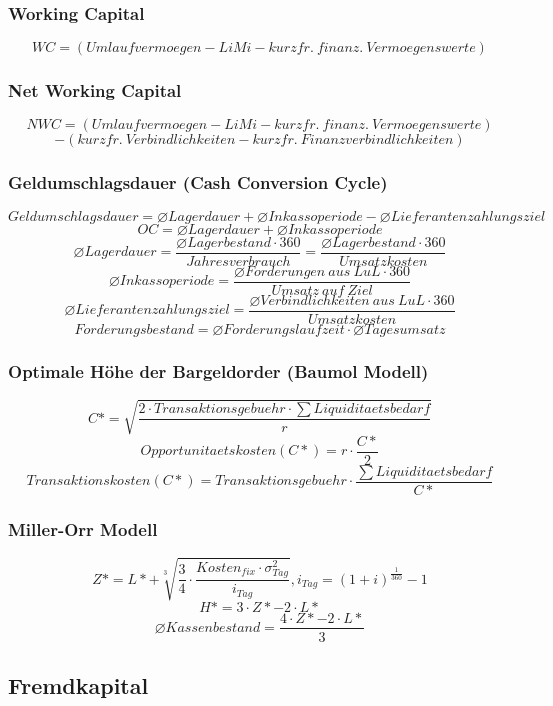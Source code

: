 \subsubsection{Working Capital}
\[WC = (Umlaufvermoegen - LiMi - kurzfr.~finanz.~Vermoegenswerte)\]

\subsubsection{Net Working Capital}
\[NWC = (Umlaufvermoegen - LiMi - kurzfr.~finanz.~Vermoegenswerte)\]
\[- (kurzfr.~Verbindlichkeiten - kurzfr.~Finanzverbindlichkeiten)\]

\subsubsection{Geldumschlagsdauer (Cash Conversion Cycle)}
\[Geldumschlagsdauer = \varnothing Lagerdauer + \varnothing Inkassoperiode - \varnothing Lieferantenzahlungsziel\]
\[OC = \varnothing Lagerdauer + \varnothing Inkassoperiode\]
\[\varnothing Lagerdauer = \frac{\varnothing Lagerbestand \cdot 360}{Jahresverbrauch} = \frac{\varnothing Lagerbestand \cdot 360}{Umsatzkosten}\]
\[\varnothing Inkassoperiode = \frac{\varnothing Forderungen~aus~LuL \cdot 360}{Umsatz~auf~Ziel}\]
\[\varnothing Lieferantenzahlungsziel = \frac{\varnothing Verbindlichkeiten~aus~LuL \cdot 360}{Umsatzkosten}\]
\[Forderungsbestand = \varnothing Forderungslaufzeit \cdot \varnothing Tagesumsatz\]

\subsubsection{Optimale Höhe der Bargeldorder (Baumol Modell)}
\[C* = \sqrt{\frac{2 \cdot Transaktionsgebuehr \cdot \sum Liquiditaetsbedarf}{r}}\]
\[Opportunitaetskosten(C*) = r \cdot \frac{C*}{2}\]
\[Transaktionskosten(C*) = Transaktionsgebuehr \cdot \frac{\sum Liquiditaetsbedarf}{C*}\]

\subsubsection{Miller-Orr Modell}
\[Z* = L* + \sqrt[3]{\frac{3}{4} \cdot \frac{Kosten_{fix} \cdot \sigma_{Tag}^2}{i_{Tag}}}, i_{Tag} = (1+i)^\frac{1}{360}-1\]
\[H* = 3 \cdot Z* - 2 \cdot L*\]
\[\varnothing Kassenbestand = \frac{4 \cdot Z* - 2 \cdot L*}{3}\]


\subsection{Fremdkapital}

